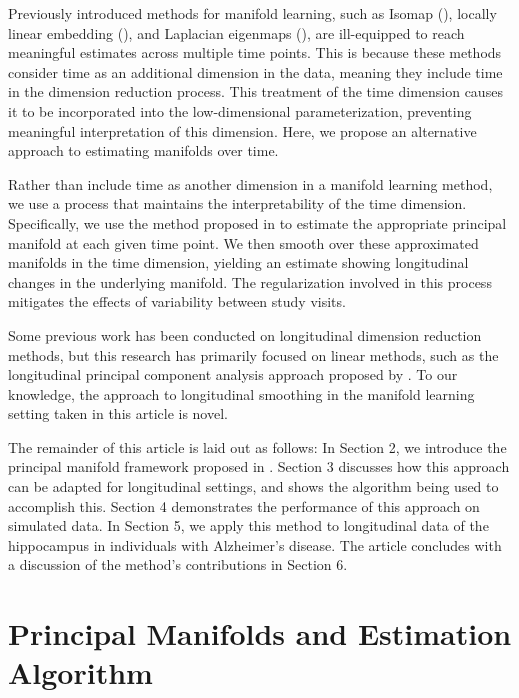 \documentclass[11pt,reqno]{article}
\begin{document}
Previously introduced methods for manifold learning, such as Isomap (\cite{tenenbaumGlobalGeometricFramework2000}), locally linear embedding (\cite{roweisNonlinearDimensionalityReduction2000}), and Laplacian eigenmaps (\cite{belkinLaplacianEigenmapsDimensionality2003a}), are ill-equipped to reach meaningful estimates across multiple time points. This is because these methods consider time as an additional dimension in the data, meaning they include time in the dimension reduction process. This treatment of the time dimension causes it to be incorporated into the low-dimensional parameterization, preventing meaningful interpretation of this dimension. Here, we propose an alternative approach to estimating manifolds over time.

Rather than include time as another dimension in a manifold learning method, we use a process that maintains the interpretability of the time dimension. Specifically, we use the method proposed in \cite{mengPrincipalManifoldEstimation2021} to estimate the appropriate principal manifold at each given time point. We then smooth over these approximated manifolds in the time dimension, yielding an estimate showing longitudinal changes in the underlying manifold. The regularization involved in this process mitigates the effects of variability between study visits.

Some previous work has been conducted on longitudinal dimension reduction methods, but this research has primarily focused on linear methods, such as the longitudinal principal component analysis approach proposed by \cite{kinsonLongitudinalPrincipalComponent2020}. To our knowledge, the approach to longitudinal smoothing in the manifold learning setting taken in this article is novel.

The remainder of this article is laid out as follows: In Section 2, we introduce the principal manifold framework proposed in \cite{mengPrincipalManifoldEstimation2021}. Section 3 discusses how this approach can be adapted for longitudinal settings, and shows the algorithm being used to accomplish this. Section 4 demonstrates the performance of this approach on simulated data. In Section 5, we apply this method to longitudinal data of the hippocampus in individuals with Alzheimer's disease. The article concludes with a discussion of the method's contributions in Section 6.

\section{Principal Manifolds and Estimation Algorithm}
\end{document}
